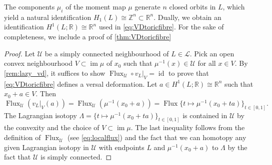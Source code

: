 \documentclass[12pt,a4paper,draft]{scrartcl}
\DeclareMathOperator{\id}{id}
\begin{document}
The components $\mu_i$ of the moment map $\mu$ generate $n$ closed orbits in $L$, which yield a natural identification $H_1(L) \cong \mathbb{Z}^n \subset \mathbb{R}^n$. Dually, we obtain an identification $H^1(L;\mathbb{R}) \cong \mathbb{R}^n$ used in \eqref{eq:VDtoricfibre}. For the sake of completeness, we include a proof of \cref{thm:VDtoricfibre}

\begin{proof}
    Let $\mathcal{U}$ be a simply connected neighbourhood of $L \in \mathcal{L}$. Pick an open convex neighbourhood $V \subset \operatorname{im} \mu$ of $x_0$ such that $\mu^{-1}(x) \in \mathcal{U}$ for all $x \in V$. By \cref{rem:lazy_vd}, it suffices to show $\operatorname{Flux}_{\mathcal{U}} \circ v_L\vert_{V} = \id$ to prove that \eqref{eq:VDtoricfibre} defines a versal deformation. Let $a \in H^1(L;\mathbb{R}) \cong \mathbb{R}^n$ such that $x_0 + a \in V$. Then 
    \begin{equation}
        \operatorname{Flux}_{\mathcal{U}} ( v_L\vert_{V} (a))
        = \operatorname{Flux}_{\mathcal{U}} (\mu^{-1}(x_0 + a))
        = \operatorname{Flux} \{t \mapsto \mu^{-1}(x_0 + ta) \}_{t \in [0,1]}.
    \end{equation}
    The Lagrangian isotopy $\Lambda = \{t \mapsto \mu^{-1}(x_0 + ta) \}_{t \in [0,1]}$ is contained in $\mathcal{U}$ by the convexity and the choice of $V \subset \operatorname{im} \mu$. The last inequality follows from the definition of $\operatorname{Flux}_{\mathcal{U}}$ (see \eqref{eq:localflux}) and the fact that we can homotopy any given Lagrangian isotopy in $\mathcal{U}$ with endpoints $L$ and $\mu^{-1}(x_0 + a)$ to $\Lambda$ by the fact that $\mathcal{U}$ is simply connected. 


\end{proof}
\end{document}
